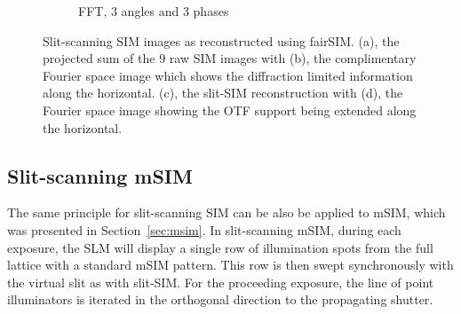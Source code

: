\begin{figure}[ht!]
\begin{subfigure}[t]{0.3\textwidth}
      \caption{\gls{FFT}, 3 angles and 3 phases}
  \end{subfigure}
  \caption[Slit-SIM images as reconstructed using fairSIM]{
  Slit-scanning \gls{SIM} images as reconstructed using fairSIM.\@
  (a), the projected sum of the 9 raw \gls{SIM} images with
  (b), the complimentary Fourier space image which shows the diffraction limited information along the horizontal.
  (c), the slit-SIM reconstruction with (d), the Fourier space image showing the OTF support being extended along the horizontal.
  }\label{fig:sim_slit_reconstructed}
\end{figure}

\subsection{Slit-scanning \gls{mSIM}}

The same principle for \gls{slit-scanning} \gls{SIM} can be also be applied to \gls{mSIM}, which was presented in Section~\ref{sec:msim}.
In \gls{slit-scanning} \gls{mSIM}, during each exposure, the \gls{SLM} will display a single row of illumination spots from the full lattice with a standard \gls{mSIM} pattern.
This row is then swept synchronously with the virtual slit as with slit-\gls{SIM}.
For the proceeding exposure, the line of point illuminators is iterated in the orthogonal direction to the propagating shutter.

